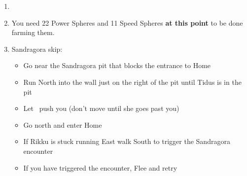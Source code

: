 \begin{enumerate}[resume]
    \item \formation{\tidus}{\rikku}{\kimahri}
    \item You need 22 Power Spheres and 11 Speed Spheres \textbf{at this point} to be done farming them.
    \lossnp
    \item Sandragora skip:
    \begin{itemize}
        \item Go near the Sandragora pit that blocks the entrance to Home
        \item Run North into the wall just on the right of the pit until Tidus is in the pit
        \item Let \rikku\ push you (don't move until she goes past you)
        \item Go north and enter Home
        \item If Rikku is stuck running East walk South to trigger the Sandragora encounter
        \item If you have triggered the encounter, Flee and retry
    \end{itemize}
\end{enumerate}
\lossnpsingle\bothnpsingle\winnpsingle

